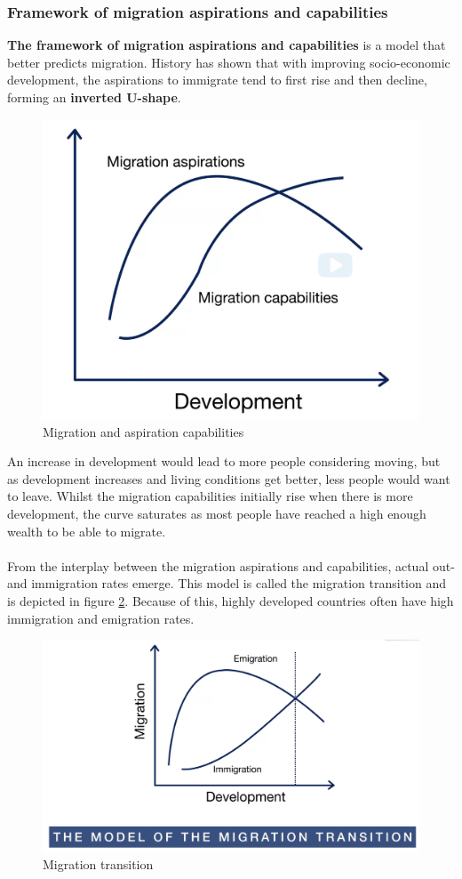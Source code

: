 \documentclass[../summary.tex]{subfiles}
\begin{document}
\subsubsection{Framework of migration aspirations and capabilities}
\textbf{The framework of migration aspirations and capabilities} is a model that better predicts migration. History has shown that with improving socio-economic development, the aspirations to immigrate tend to first rise and then decline, forming an \textbf{inverted U-shape}.
\begin{figure}[h]
	\centering
	\includegraphics[width=0.6\linewidth]{../images/7-framework-capabilites}
	\caption{Migration and aspiration capabilities}
	\label{fig:framework-capabilites}
\end{figure}

An increase in development would lead to more people considering moving, but as development increases and living conditions get better, less people would want to leave. Whilst the migration capabilities initially rise when there is more development, the curve saturates as most people have reached a high enough wealth to be able to migrate.
\\\\
From the interplay between the migration aspirations and capabilities, actual out- and immigration rates emerge. This model is called the migration transition and is depicted in figure \ref{fig:migration-transition}. Because of this, highly developed countries often have high immigration and emigration rates.
\begin{figure}[h]
	\centering
	\includegraphics[width=0.7\linewidth]{../images/7-migration-transition}
	\caption{Migration transition}
	\label{fig:migration-transition}
\end{figure}
\end{document}

